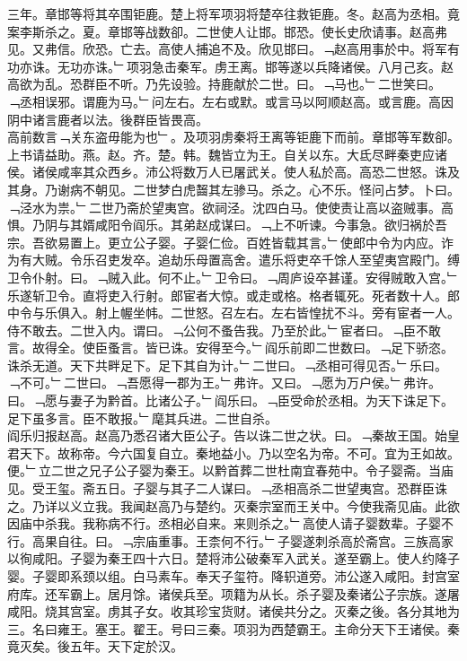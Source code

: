 \documentclass{zhvt-classic}
\begin{document}
\hspace*{2em}三年。章邯等将其卒围钜鹿。楚上将军项羽将楚卒往救钜鹿。冬。赵高为丞相。竟案李斯杀之。夏。章邯等战数卻。二世使人让邯。邯恐。使长史欣请事。赵高弗见。又弗信。欣恐。亡去。高使人捕追不及。欣见邯曰。﹁赵高用事於中。将军有功亦诛。无功亦诛。﹂项羽急击秦军。虏王离。邯等遂以兵降诸侯。八月己亥。赵高欲为乱。恐群臣不听。乃先设验。持鹿献於二世。曰。﹁马也。﹂二世笑曰。﹁丞相误邪。谓鹿为马。﹂问左右。左右或默。或言马以阿顺赵高。或言鹿。高因阴中诸言鹿者以法。後群臣皆畏高。\\
\hspace*{2em}高前数言﹁关东盗毋能为也﹂。及项羽虏秦将王离等钜鹿下而前。章邯等军数卻。上书请益助。燕。赵。齐。楚。韩。魏皆立为王。自关以东。大氐尽畔秦吏应诸侯。诸侯咸率其众西乡。沛公将数万人已屠武关。使人私於高。高恐二世怒。诛及其身。乃谢病不朝见。二世梦白虎齧其左骖马。杀之。心不乐。怪问占梦。卜曰。﹁泾水为祟。﹂二世乃斋於望夷宫。欲祠泾。沈四白马。使使责让高以盗贼事。高惧。乃阴与其婿咸阳令阎乐。其弟赵成谋曰。﹁上不听谏。今事急。欲归祸於吾宗。吾欲易置上。更立公子婴。子婴仁俭。百姓皆载其言。﹂使郎中令为内应。诈为有大贼。令乐召吏发卒。追劫乐母置高舍。遣乐将吏卒千馀人至望夷宫殿门。缚卫令仆射。曰。﹁贼入此。何不止。﹂卫令曰。﹁周庐设卒甚谨。安得贼敢入宫。﹂乐遂斩卫令。直将吏入行射。郎宦者大惊。或走或格。格者辄死。死者数十人。郎中令与乐俱入。射上幄坐帏。二世怒。召左右。左右皆惶扰不斗。旁有宦者一人。侍不敢去。二世入内。谓曰。﹁公何不蚤告我。乃至於此。﹂宦者曰。﹁臣不敢言。故得全。使臣蚤言。皆已诛。安得至今。﹂阎乐前即二世数曰。﹁足下骄恣。诛杀无道。天下共畔足下。足下其自为计。﹂二世曰。﹁丞相可得见否。﹂乐曰。﹁不可。﹂二世曰。﹁吾愿得一郡为王。﹂弗许。又曰。﹁愿为万户侯。﹂弗许。曰。﹁愿与妻子为黔首。比诸公子。﹂阎乐曰。﹁臣受命於丞相。为天下诛足下。足下虽多言。臣不敢报。﹂麾其兵进。二世自杀。\\
\hspace*{2em}阎乐归报赵高。赵高乃悉召诸大臣公子。告以诛二世之状。曰。﹁秦故王国。始皇君天下。故称帝。今六国复自立。秦地益小。乃以空名为帝。不可。宜为王如故。便。﹂立二世之兄子公子婴为秦王。以黔首葬二世杜南宜春苑中。令子婴斋。当庙见。受王玺。斋五日。子婴与其子二人谋曰。﹁丞相高杀二世望夷宫。恐群臣诛之。乃详以义立我。我闻赵高乃与楚约。灭秦宗室而王关中。今使我斋见庙。此欲因庙中杀我。我称病不行。丞相必自来。来则杀之。﹂高使人请子婴数辈。子婴不行。高果自往。曰。﹁宗庙重事。王柰何不行。﹂子婴遂刺杀高於斋宫。三族高家以徇咸阳。子婴为秦王四十六日。楚将沛公破秦军入武关。遂至霸上。使人约降子婴。子婴即系颈以组。白马素车。奉天子玺符。降轵道旁。沛公遂入咸阳。封宫室府库。还军霸上。居月馀。诸侯兵至。项籍为从长。杀子婴及秦诸公子宗族。遂屠咸阳。烧其宫室。虏其子女。收其珍宝货财。诸侯共分之。灭秦之後。各分其地为三。名曰雍王。塞王。翟王。号曰三秦。项羽为西楚霸王。主命分天下王诸侯。秦竟灭矣。後五年。天下定於汉。\\
\end{document}
